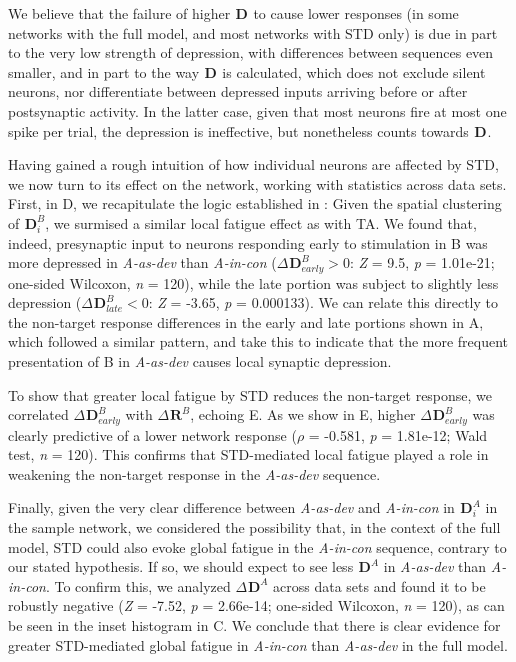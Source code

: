 \documentclass[9pt,lineno,onehalfspacing]{elife}
\newcommand{\dev}{\textit{A-as-dev}}
\newcommand{\msc}{\textit{A-in-con}}
\newcommand{\R}[3][]{{}^{#1}_{}\boldsymbol R^{#2}_{#3}}
\newcommand{\D}[3][]{{}^{#1}_{}\boldsymbol D^{#2}_{#3}}
\begin{document}
We believe that the failure of higher $\D{}{}$ to cause lower responses (in some networks with the full model, and most networks with STD only) is due in part to the very low strength of depression, with differences between sequences even smaller, and in part to the way $\D{}{}$ is calculated, which does not exclude silent neurons, nor differentiate between depressed inputs arriving before or after postsynaptic activity. In the latter case, given that most neurons fire at most one spike per trial, the depression is ineffective, but nonetheless counts towards $\D{}{}$.

Having gained a rough intuition of how individual neurons are affected by STD, we now turn to its effect on the network, working with statistics across data sets. First, in D, we recapitulate the logic established in : Given the spatial clustering of $\D{B}{i}$, we surmised a similar local fatigue effect as with TA. We found that, indeed, presynaptic input to neurons responding early to stimulation in B was more depressed in \dev{} than \msc{} ($\Delta \D{B}{early} > 0$: \textit{Z} = 9.5, \textit{p} = 1.01e-21; one-sided Wilcoxon, \textit{n} = 120), while the late portion was subject to slightly less depression ($\Delta \D{B}{late} < 0$: \textit{Z} = -3.65, \textit{p} = 0.000133). We can relate this directly to the non-target response differences in the early and late portions shown in A, which followed a similar pattern, and take this to indicate that the more frequent presentation of B in \dev{} causes local synaptic depression. %

To show that greater local fatigue by STD reduces the non-target response, we correlated $\Delta \D{B}{early}$ with $\Delta \R{B}{}$, echoing E. As we show in E, higher $\Delta \D{B}{early}$ was clearly predictive of a lower network response ($\rho$ = -0.581, \textit{p} = 1.81e-12; Wald test, \textit{n} = 120). This confirms that STD-mediated local fatigue played a role in weakening the non-target response in the \dev{} sequence.

Finally, given the very clear difference between \dev{} and \msc{} in $\D{A}{i}$ in the sample network, we considered the possibility that, in the context of the full model, STD could also evoke global fatigue in the \msc{} sequence, contrary to our stated hypothesis. If so, we should expect to see less $\D{A}{}$ in \dev{} than \msc{}. To confirm this, we analyzed $\Delta \D{A}{}$ across data sets and found it to be robustly negative (\textit{Z} = -7.52, \textit{p} = 2.66e-14; one-sided Wilcoxon, \textit{n} = 120), as can be seen in the inset histogram in C. We conclude that there is clear evidence for greater STD-mediated global fatigue in \msc{} than \dev{} in the full model.
\end{document}
